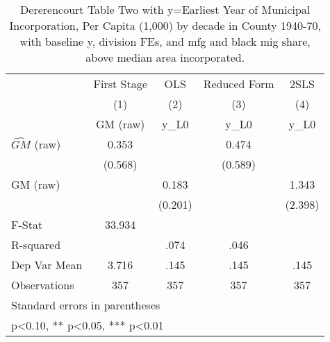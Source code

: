 \begin{table}[htbp]\centering
\def\sym#1{\ifmmode^{#1}\else\(^{#1}\)\fi}
\caption{Dererencourt Table Two with y=Earliest Year of Municipal Incorporation, Per Capita (1,000) by decade in County 1940-70, with baseline y, division FEs, and mfg and black mig share, above median area incorporated.}
\begin{tabular}{l*{4}{c}}
\toprule
                    & First Stage   &         OLS   &Reduced Form   &        2SLS   \\
                    &\multicolumn{1}{c}{(1)}&\multicolumn{1}{c}{(2)}&\multicolumn{1}{c}{(3)}&\multicolumn{1}{c}{(4)}\\
                    &\multicolumn{1}{c}{GM  (raw)}&\multicolumn{1}{c}{y\_L0}&\multicolumn{1}{c}{y\_L0}&\multicolumn{1}{c}{y\_L0}\\
\midrule
$\hat{GM}$ (raw)    &       0.353   &               &       0.474   &               \\
                    &     (0.568)   &               &     (0.589)   &               \\
\addlinespace
GM  (raw)           &               &       0.183   &               &       1.343   \\
                    &               &     (0.201)   &               &     (2.398)   \\
\midrule
F-Stat              &      33.934   &               &               &               \\
R-squared           &               &        .074   &        .046   &               \\
Dep Var Mean        &       3.716   &        .145   &        .145   &        .145   \\
Observations        &         357   &         357   &         357   &         357   \\
\bottomrule
\multicolumn{5}{l}{\footnotesize Standard errors in parentheses}\\
\multicolumn{5}{l}{\footnotesize * p<0.10, ** p<0.05, *** p<0.01}\\
\end{tabular}
\end{table}
